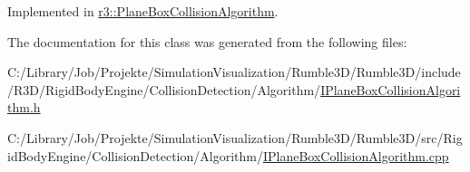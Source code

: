 Implemented in \mbox{\hyperlink{classr3_1_1_plane_box_collision_algorithm_a529c85973e9dab38e7427cdf9177d9ba}{r3\+::\+Plane\+Box\+Collision\+Algorithm}}.



The documentation for this class was generated from the following files\+:\begin{DoxyCompactItemize}
\item 
C\+:/\+Library/\+Job/\+Projekte/\+Simulation\+Visualization/\+Rumble3\+D/\+Rumble3\+D/include/\+R3\+D/\+Rigid\+Body\+Engine/\+Collision\+Detection/\+Algorithm/\mbox{\hyperlink{_i_plane_box_collision_algorithm_8h}{I\+Plane\+Box\+Collision\+Algorithm.\+h}}\item 
C\+:/\+Library/\+Job/\+Projekte/\+Simulation\+Visualization/\+Rumble3\+D/\+Rumble3\+D/src/\+Rigid\+Body\+Engine/\+Collision\+Detection/\+Algorithm/\mbox{\hyperlink{_i_plane_box_collision_algorithm_8cpp}{I\+Plane\+Box\+Collision\+Algorithm.\+cpp}}\end{DoxyCompactItemize}
